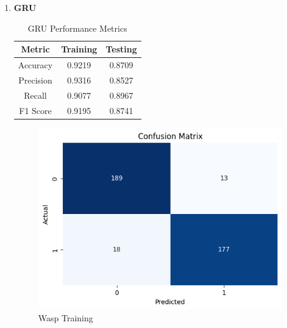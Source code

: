 \documentclass[12pt]{article}
\begin{document}
\begin{enumerate}
		\item \textbf{GRU} \\
		\begin{table}[H]
			\centering
			\caption{GRU Performance Metrics}
			\vspace{0.25 cm}
			\begin{tabular}{|c|c|c|}
				\hline
				\textbf{Metric} & \textbf{Training} & \textbf{Testing} \\
				\hline
				Accuracy & 0.9219  & 0.8709 \\ \hline
				Precision & 0.9316 & 0.8527 \\ \hline
				Recall & 0.9077 & 0.8967 \\ \hline
				F1 Score & 0.9195  & 0.8741 \\ \hline
			\end{tabular}
			\label{tab:GRU_METRICS}
		\end{table}
		\begin{figure}[H]
			\centering
			\begin{minipage}[H]{0.45\textwidth}
				\centering
				\includegraphics[width=\textwidth]{Images/Confusion/GRU train.png}\\ \vspace{0.25 cm}
				Wasp Training
			\end{minipage}
			\hfill
			\begin{minipage}[H]{0.45\textwidth}
				\centering

\end{minipage}
\end{figure}
\end{enumerate}
\end{document}
